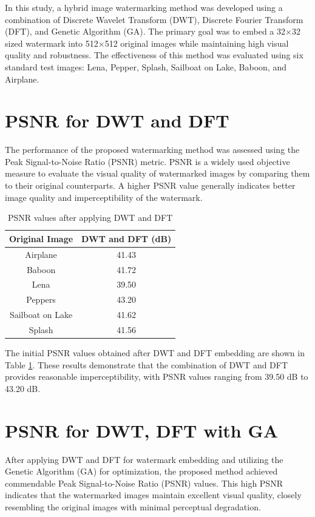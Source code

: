 In this study, a hybrid image watermarking method was developed using a combination of Discrete Wavelet Transform (DWT), Discrete Fourier Transform (DFT), and Genetic Algorithm (GA). The primary goal was to embed a 32$\times$32 sized watermark into 512$\times$512 original images while maintaining high visual quality and robustness. The effectiveness of this method was evaluated using six standard test images: Lena, Pepper, Splash, Sailboat on Lake, Baboon, and Airplane.

\section{PSNR for DWT and DFT}

The performance of the proposed watermarking method was assessed using the Peak Signal-to-Noise Ratio (PSNR) metric. PSNR is a widely used objective measure to evaluate the visual quality of watermarked images by comparing them to their original counterparts. A higher PSNR value generally indicates better image quality and imperceptibility of the watermark.

\begin{table}[H]
\centering
\begin{tabular}{|c|c|}
\hline
\textbf{Original Image} & \textbf{DWT and DFT (dB)} \\
\hline
Airplane & 41.43 \\
\hline
Baboon & 41.72 \\
\hline
Lena & 39.50 \\
\hline
Peppers & 43.20 \\
\hline
Sailboat on Lake & 41.62 \\
\hline
Splash & 41.56 \\
\hline
\end{tabular}
\caption{PSNR values after applying DWT and DFT}
\label{tab:results1}
\end{table}

The initial PSNR values obtained after DWT and DFT embedding are shown in Table \ref{tab:results1}. These results demonstrate that the combination of DWT and DFT provides reasonable imperceptibility, with PSNR values ranging from 39.50 dB to 43.20 dB.

\section{PSNR for DWT, DFT with GA}

After applying DWT and DFT for watermark embedding and utilizing the Genetic Algorithm (GA) for optimization, the proposed method achieved commendable Peak Signal-to-Noise Ratio (PSNR) values. This high PSNR indicates that the watermarked images maintain excellent visual quality, closely resembling the original images with minimal perceptual degradation.

